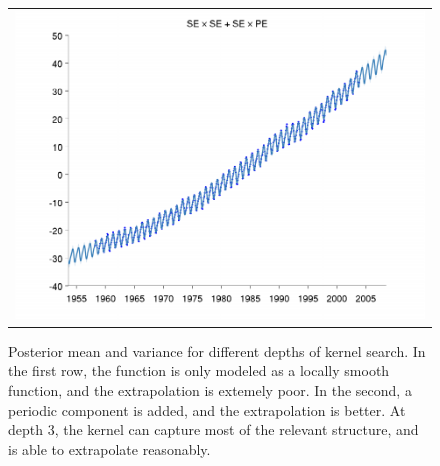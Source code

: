 \documentclass[twoside]{article}
\begin{document}
\begin{figure}[h!]
\begin{tabular}{c}
 \includegraphics[width=\wmg,height=\hmg]{../figures/decomposition/03-mauna2003_max_level_2/03-mauna2003_all}
\end{tabular}
\caption{Posterior mean and variance for different depths of kernel search.  In the first row, the function is only modeled as a locally smooth function, and the extrapolation is extemely poor.  In the second, a periodic component is added, and the extrapolation is better.  At depth 3, the kernel can capture most of the relevant structure, and is able to extrapolate reasonably. }
\label{fig:mauna_grow}
\end{figure}
\end{document}

